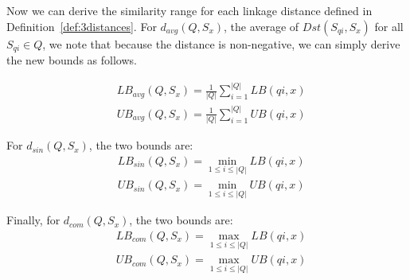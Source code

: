 Now we can derive the similarity range for each linkage distance
defined in Definition~\ref{def:3distances}. For $d_{avg}(Q, S_x)$, 
the average of $Dst(S_{qi},S_x)$ for all $S_{qi} \in Q$, we note that because the
distance is non-negative, we can simply derive the new bounds as
follows.

{\small
\begin{align}
&LB_{avg}(Q, S_x)=\frac{1}{|Q|}\sum_{i=1}^{|Q|}LB(qi, x) \label{eq:avg_LB}\\
&UB_{avg}(Q, S_x)=\frac{1}{|Q|}\sum_{i=1}^{|Q|}UB(qi, x) \label{eq:avg_UB}
\end{align}
}

\noindent
For $d_{sin}(Q, S_x)$, the two bounds are:
{\small
\begin{align}
&LB_{sin}(Q, S_x) = \min_{1 \leq i \leq |Q|}LB(qi, x) 
\label{eq:sin_LB}\\
&UB_{sin}(Q, S_x) = \min_{1 \leq i \leq |Q|}UB(qi, x) \label{eq:sin_UB}
\end{align}
}

\noindent
Finally, for $d_{com}(Q, S_x)$, the two bounds are:
{\small
\begin{align}
&LB_{com}(Q, S_x) = \max_{1 \leq i \leq |Q|}LB(qi, x) \label{eq:com_LB}\\
&UB_{com}(Q, S_x) = \max_{1 \leq i \leq |Q|}UB(qi, x) \label{eq:com_UB}
\end{align}
}

